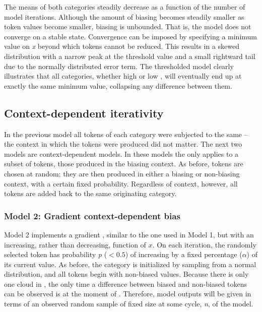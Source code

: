 The means of both categories steadily decrease as a function of the
number of model iterations. Although the amount of biasing becomes
steadily smaller as token values become smaller, biasing is unbounded.
That is, the model does not converge on a stable state. Convergence
can be imposed by specifying a minimum value on \emph{x} beyond which
tokens cannot be reduced. This results in a skewed distribution with
a narrow peak at the threshold value and a small rightward tail due
to the normally distributed error term. The thresholded model clearly
illustrates that all categories, whether high or low , will
eventually end up at exactly the same minimum value, collapsing any
difference between them. 

\subsection{Context-dependent iterativity}\label{sec:Context-Dependent-Iterativity}

In the previous model all tokens of each category were subjected to
the same   – the context in which the tokens were produced
did not matter. The next two models are context-dependent models.
In these models the   only applies to a subset of tokens,
those produced in the biasing context. As before,  tokens
are chosen at random; they are then produced in either a biasing or
non-biasing context, with a certain fixed probability. Regardless
of  context, however, all tokens are added back to the same
originating category.

\subsubsection{\label{subsec:Phrase-Final Lengthening}Model 2: Gradient context-dependent bias}

Model 2 implements a gradient  , similar to the one
used in Model 1, but with an increasing, rather than decreasing, function
of $x$. On each iteration, the randomly selected token has probability
\emph{p} ($< 0.5$) of increasing by a fixed percentage ($\alpha$) of
its current value. As before, the category is initialized by sampling
from a normal distribution, and all tokens begin with non-biased values.
Because there is only one cloud in , the only time a difference
between biased and non-biased tokens can be observed is at the moment
of . Therefore, model outputs will be given in terms of
an observed random sample of fixed size at some cycle, \emph{n}, of
the model.

